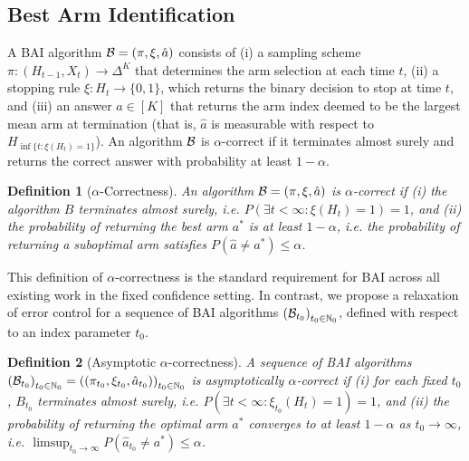 \documentclass{article}
\newtheorem{definition}{Definition}
\begin{document}
\subsection{Best Arm Identification}

A BAI algorithm $\mathcal{B} = ( \pi, \xi, \hat{a})$ consists of (i) a sampling scheme $\pi: (H_{t-1},X_t) \rightarrow \Delta^K$ that determines the arm selection at each time $t$, (ii) a stopping rule $\xi: H_t \rightarrow \{0,1\}$, which returns the binary decision to stop at time $t$, and (iii) an answer $\hat{a} \in [K]$ that returns the arm index deemed to be the largest mean arm at termination (that is, $\hat a$ is measurable with respect to $H_{\inf\{t:\xi(H_t)=1\}}$). An algorithm $\mathcal{B}$ is $\alpha$-correct if it terminates almost surely and returns the correct answer with probability at least $1-\alpha$.


\begin{definition}[$\alpha$-Correctness]\label{defn:alpha_correctness}
   An algorithm $\mathcal{B} = (\pi, \xi, \hat{a})$ is $\alpha$-correct if (i) the algorithm $B$ terminates almost surely, i.e. $P\left(\exists t < \infty: \xi(H_t) = 1\right) = 1$, and (ii) the probability of returning the best arm $a^*$ is at least $1-\alpha$, i.e. the probability of returning a suboptimal arm satisfies $P(\hat{a} \neq a^*) \leq \alpha$.
\end{definition}

This definition of $\alpha$-correctness is the standard requirement for BAI across all existing work in the fixed confidence setting. In contrast, we propose a relaxation of error control for a sequence of BAI algorithms $\left(\mathcal{B}_{t_0}\right)_{t_0 \in \mathbb{N}_0}$, defined with respect to an index parameter $t_0$. 

\begin{definition}[Asymptotic $\alpha$-correctness]\label{defn:asymp_alpha_correctness}
A sequence of BAI algorithms $\left(\mathcal{B}_{t_0}\right)_{t_0 \in \mathbb{N}_0} = \left((\pi_{t_0}, \xi_{t_0}, \hat{a}_{t_0})\right)_{t_0 \in \mathbb{N}_0}$ is asymptotically $\alpha$-correct if (i) for each fixed $t_0$, $B_{t_0}$ terminates almost surely, i.e. $P\left(\exists t < \infty: \xi_{t_0}(H_t) = 1\right)=1$, and (ii) the probability of returning the optimal arm $a^*$ converges to at least $1-\alpha$ as $t_0 \rightarrow \infty$, i.e. $\limsup_{t_0 \rightarrow \infty} P(\hat{a}_{t_0} \neq a^*) \leq \alpha$. 
\end{definition}
\end{document}
